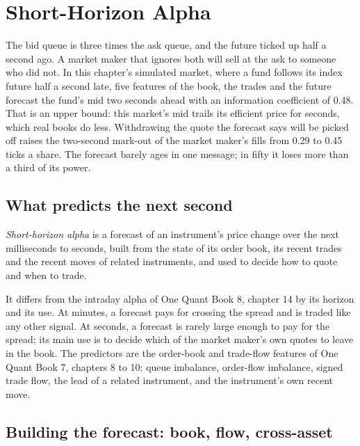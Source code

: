 \chapter{Short-Horizon Alpha}\label{ch:hf:short-horizon-alpha}

The bid queue is three times the ask queue, and the future ticked up half a second ago. A market maker that ignores both will sell at the ask to
someone who did not. In this chapter's simulated market, where a fund follows its index future half a second late, five features of the book, the
trades and the future forecast the fund's mid two seconds ahead with an information coefficient of 0.48. That is an upper bound: this market's mid
trails its efficient price for seconds, which real books do less. Withdrawing the quote the forecast says will be picked off raises the two-second
mark-out of the market maker's fills from 0.29 to 0.45 ticks a share. The forecast barely ages in one message; in fifty it loses more than a third of
its power.

\section{What predicts the next second}

\begin{definition}\label{def:hf:short-horizon-alpha:alpha}
\emph{Short-horizon alpha} is a forecast of an instrument's price change over the next milliseconds to seconds, built
from the state of its order book, its recent trades and the recent moves of related instruments, and used to decide how to quote and when to trade.
\end{definition}

It differs from the intraday alpha of One Quant Book 8, chapter 14 by its horizon and its use. At minutes, a forecast pays for crossing the spread
and is traded like any other signal. At seconds, a forecast is rarely large enough to pay for the spread; its main use is to decide which of the
market maker's own quotes to leave in the book. The predictors are the order-book and trade-flow features of One Quant Book 7, chapters 8 to 10: queue
imbalance, order-flow imbalance, signed trade flow, the lead of a related instrument, and the instrument's own recent move.

\section{Building the forecast: book, flow, cross-asset}

